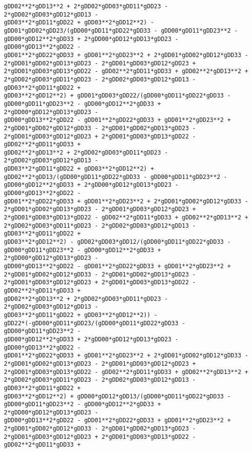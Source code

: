 \documentclass[landscape,letterpaper,10pt,english]{article}
\begin{document}
\begin{Verbatim}[commandchars=\\\{\}]
gDD02**2*gDD13**2 + 2*gDD02*gDD03*gDD11*gDD23 - 2*gDD02*gDD03*gDD12*gDD13 -
gDD03**2*gDD11*gDD22 + gDD03**2*gDD12**2) -
gDD01*gDD02*gDD23/(gDD00*gDD11*gDD22*gDD33 - gDD00*gDD11*gDD23**2 -
gDD00*gDD12**2*gDD33 + 2*gDD00*gDD12*gDD13*gDD23 - gDD00*gDD13**2*gDD22 -
gDD01**2*gDD22*gDD33 + gDD01**2*gDD23**2 + 2*gDD01*gDD02*gDD12*gDD33 -
2*gDD01*gDD02*gDD13*gDD23 - 2*gDD01*gDD03*gDD12*gDD23 +
2*gDD01*gDD03*gDD13*gDD22 - gDD02**2*gDD11*gDD33 + gDD02**2*gDD13**2 +
2*gDD02*gDD03*gDD11*gDD23 - 2*gDD02*gDD03*gDD12*gDD13 - gDD03**2*gDD11*gDD22 +
gDD03**2*gDD12**2) + gDD01*gDD03*gDD22/(gDD00*gDD11*gDD22*gDD33 -
gDD00*gDD11*gDD23**2 - gDD00*gDD12**2*gDD33 + 2*gDD00*gDD12*gDD13*gDD23 -
gDD00*gDD13**2*gDD22 - gDD01**2*gDD22*gDD33 + gDD01**2*gDD23**2 +
2*gDD01*gDD02*gDD12*gDD33 - 2*gDD01*gDD02*gDD13*gDD23 -
2*gDD01*gDD03*gDD12*gDD23 + 2*gDD01*gDD03*gDD13*gDD22 - gDD02**2*gDD11*gDD33 +
gDD02**2*gDD13**2 + 2*gDD02*gDD03*gDD11*gDD23 - 2*gDD02*gDD03*gDD12*gDD13 -
gDD03**2*gDD11*gDD22 + gDD03**2*gDD12**2) +
gDD02**2*gDD13/(gDD00*gDD11*gDD22*gDD33 - gDD00*gDD11*gDD23**2 -
gDD00*gDD12**2*gDD33 + 2*gDD00*gDD12*gDD13*gDD23 - gDD00*gDD13**2*gDD22 -
gDD01**2*gDD22*gDD33 + gDD01**2*gDD23**2 + 2*gDD01*gDD02*gDD12*gDD33 -
2*gDD01*gDD02*gDD13*gDD23 - 2*gDD01*gDD03*gDD12*gDD23 +
2*gDD01*gDD03*gDD13*gDD22 - gDD02**2*gDD11*gDD33 + gDD02**2*gDD13**2 +
2*gDD02*gDD03*gDD11*gDD23 - 2*gDD02*gDD03*gDD12*gDD13 - gDD03**2*gDD11*gDD22 +
gDD03**2*gDD12**2) - gDD02*gDD03*gDD12/(gDD00*gDD11*gDD22*gDD33 -
gDD00*gDD11*gDD23**2 - gDD00*gDD12**2*gDD33 + 2*gDD00*gDD12*gDD13*gDD23 -
gDD00*gDD13**2*gDD22 - gDD01**2*gDD22*gDD33 + gDD01**2*gDD23**2 +
2*gDD01*gDD02*gDD12*gDD33 - 2*gDD01*gDD02*gDD13*gDD23 -
2*gDD01*gDD03*gDD12*gDD23 + 2*gDD01*gDD03*gDD13*gDD22 - gDD02**2*gDD11*gDD33 +
gDD02**2*gDD13**2 + 2*gDD02*gDD03*gDD11*gDD23 - 2*gDD02*gDD03*gDD12*gDD13 -
gDD03**2*gDD11*gDD22 + gDD03**2*gDD12**2)) -
gDD22*(-gDD00*gDD11*gDD23/(gDD00*gDD11*gDD22*gDD33 - gDD00*gDD11*gDD23**2 -
gDD00*gDD12**2*gDD33 + 2*gDD00*gDD12*gDD13*gDD23 - gDD00*gDD13**2*gDD22 -
gDD01**2*gDD22*gDD33 + gDD01**2*gDD23**2 + 2*gDD01*gDD02*gDD12*gDD33 -
2*gDD01*gDD02*gDD13*gDD23 - 2*gDD01*gDD03*gDD12*gDD23 +
2*gDD01*gDD03*gDD13*gDD22 - gDD02**2*gDD11*gDD33 + gDD02**2*gDD13**2 +
2*gDD02*gDD03*gDD11*gDD23 - 2*gDD02*gDD03*gDD12*gDD13 - gDD03**2*gDD11*gDD22 +
gDD03**2*gDD12**2) + gDD00*gDD12*gDD13/(gDD00*gDD11*gDD22*gDD33 -
gDD00*gDD11*gDD23**2 - gDD00*gDD12**2*gDD33 + 2*gDD00*gDD12*gDD13*gDD23 -
gDD00*gDD13**2*gDD22 - gDD01**2*gDD22*gDD33 + gDD01**2*gDD23**2 +
2*gDD01*gDD02*gDD12*gDD33 - 2*gDD01*gDD02*gDD13*gDD23 -
2*gDD01*gDD03*gDD12*gDD23 + 2*gDD01*gDD03*gDD13*gDD22 - gDD02**2*gDD11*gDD33 +

\end{Verbatim}
\end{document}
